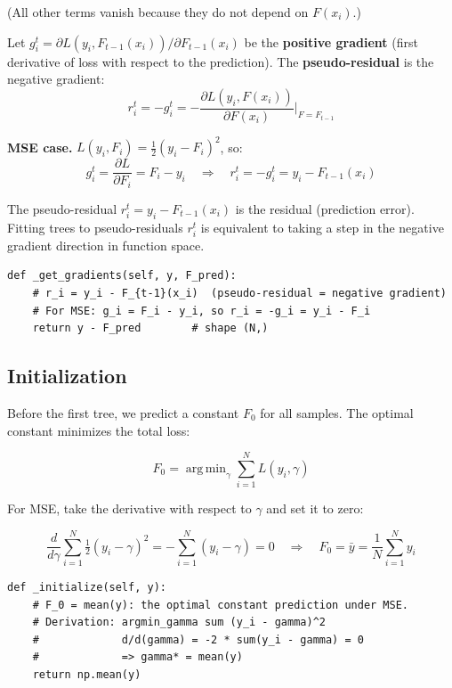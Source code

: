 \documentclass[11pt, a4paper]{article}
\begin{document}
(All other terms vanish because they do not depend on $F(x_i)$.)

Let $g_i^t = \partial L(y_i, F_{t-1}(x_i))/\partial F_{t-1}(x_i)$ be the
\textbf{positive gradient} (first derivative of loss with respect to the prediction).
The \textbf{pseudo-residual} is the negative gradient:
\[
r_i^t = -g_i^t = -\frac{\partial L(y_i, F(x_i))}{\partial F(x_i)}\bigg|_{F = F_{t-1}}
\]

\textbf{MSE case.}
$L(y_i, F_i) = \tfrac{1}{2}(y_i - F_i)^2$, so:
\[
g_i^t = \frac{\partial L}{\partial F_i} = F_i - y_i
\quad\Rightarrow\quad
r_i^t = -g_i^t = y_i - F_{t-1}(x_i)
\]

The pseudo-residual $r_i^t = y_i - F_{t-1}(x_i)$ is the residual (prediction error).
Fitting trees to pseudo-residuals $r_i^t$ is equivalent to taking a step in the
negative gradient direction in function space.

\begin{listing}[H]
\caption{Pseudo-residual computation (\texttt{vanilla\_gbm.py})}
\begin{verbatim}
def _get_gradients(self, y, F_pred):
    # r_i = y_i - F_{t-1}(x_i)  (pseudo-residual = negative gradient)
    # For MSE: g_i = F_i - y_i, so r_i = -g_i = y_i - F_i
    return y - F_pred        # shape (N,)
\end{verbatim}
\end{listing}

\subsection{Initialization}

Before the first tree, we predict a constant $F_0$ for all samples.
The optimal constant minimizes the total loss:

\[
F_0 = \operatorname{arg\,min}_\gamma \sum_{i=1}^N L(y_i, \gamma)
\]

For MSE, take the derivative with respect to $\gamma$ and set it to zero:

\[
\frac{d}{d\gamma} \sum_{i=1}^N \tfrac{1}{2}(y_i - \gamma)^2
= -\sum_{i=1}^N (y_i - \gamma) = 0
\quad\Rightarrow\quad
\boxed{F_0 = \bar{y} = \frac{1}{N}\sum_{i=1}^N y_i}
\]

\begin{listing}[H]
\caption{Initialization (\texttt{vanilla\_gbm.py})}
\begin{verbatim}
def _initialize(self, y):
    # F_0 = mean(y): the optimal constant prediction under MSE.
    # Derivation: argmin_gamma sum (y_i - gamma)^2
    #             d/d(gamma) = -2 * sum(y_i - gamma) = 0
    #             => gamma* = mean(y)
    return np.mean(y)
\end{verbatim}
\end{listing}
\end{document}
